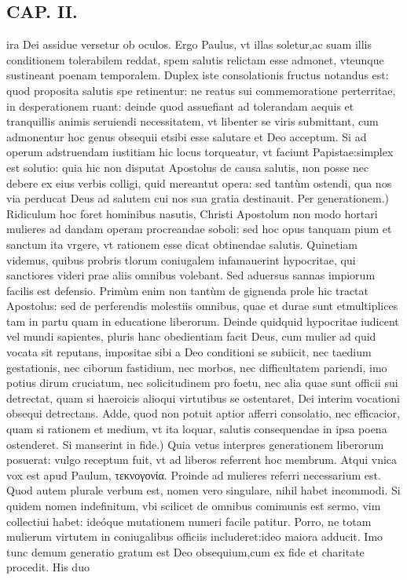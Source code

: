 \documentclass{article}
\begin{document}
\begin{pages}
\section*{CAP. II. }
\marginpar{[ p.29 ]}\pstart ira Dei assidue versetur ob oculos. Ergo Paulus, vt illas soletur,ac suam illis conditionem tolerabilem reddat, spem salutis relictam esse admonet, vteunque sustineant poenam temporalem. Duplex iste consolationis fructus notandus est: quod proposita salutis spe retinentur: ne reatus sui commemoratione perterritae, in desperationem ruant: deinde quod assuefiant ad tolerandam aequis et tranquillis animis seruiendi necessitatem, vt libenter se viris submittant, cum admonentur hoc genus obsequii etsibi esse salutare et Deo acceptum. Si ad operum adstruendam iustitiam hic locus torqueatur, vt faciunt Papistae:simplex est solutio: quia hic non disputat Apostolus de causa salutis, non posse nec debere ex eius verbis colligi, quid mereantut opera: sed tantùm ostendi, qua nos via perducat Deus ad salutem cui nos sua gratia destinauit.  \pend\pstart Per generationem.) Ridiculum hoc foret hominibus nasutis, Christi Apostolum non modo hortari mulieres ad dandam operam procreandae soboli: sed hoc opus tanquam pium et sanctum ita vrgere, vt rationem esse dicat obtinendae salutis. Quinetiam videmus, quibus probris tlorum coniugalem infamauerint hypocritae, qui sanctiores videri prae aliis omnibus volebant. Sed aduersus sannas impiorum facilis est defensio. Primùm enim non tantùm de gignenda prole hic tractat Apostolus: sed de perferendis molestiis omnibus, quae et durae sunt etmultiplices tam in partu quam in educatione liberorum. Deinde quidquid hypocritae iudicent vel mundi sapientes, pluris hanc obedientiam facit Deus, cum mulier ad quid vocata sit reputans, impositae sibi a Deo conditioni se subiicit, nec taedium gestationis, nec ciborum fastidium, nec morbos, nec difficultatem pariendi, imo potius dirum cruciatum, nec solicitudinem pro foetu, nec alia quae sunt officii sui detrectat, quam si haeroicis alioqui virtutibus se ostentaret, Dei interim vocationi obsequi detrectans. Adde, quod non potuit aptior afferri consolatio, nec efficacior, quam si rationem et medium, vt ita loquar, salutis consequendae in ipsa poena ostenderet.  \pend\pstart Si manserint in fide.) Quia vetus interpres generationem liberorum posuerat: vulgo receptum fuit, vt ad liberos referrent hoc membrum. Atqui vnica vox est apud Paulum, τεκνογονία. Proinde ad mulieres referri necessarium est. Quod autem plurale verbum est, nomen vero singulare, nihil habet incommodi. Si quidem nomen indefinitum, vbi scilicet de omnibus comimunis est sermo, vim collectiui habet: ideóque mutationem numeri facile patitur. Porro, ne totam mulierum virtutem in coniugalibus officiis includeret:ideo maiora adducit. Imo tunc demum generatio gratum est Deo obsequium,cum ex fide et charitate procedit. His duo\pend

\end{pages}
\end{document}
